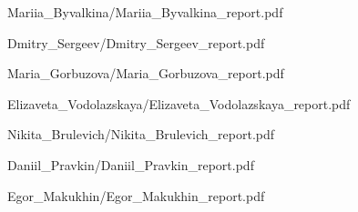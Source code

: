 \documentclass[a4paper]{article}
\begin{document}
{Mariia_Byvalkina/Mariia_Byvalkina_report.pdf}

{Dmitry_Sergeev/Dmitry_Sergeev_report.pdf}

{Maria_Gorbuzova/Maria_Gorbuzova_report.pdf}

{Elizaveta_Vodolazskaya/Elizaveta_Vodolazskaya_report.pdf}

{Nikita_Brulevich/Nikita_Brulevich_report.pdf}

{Daniil_Pravkin/Daniil_Pravkin_report.pdf}

{Egor_Makukhin/Egor_Makukhin_report.pdf}
\end{document}
